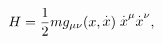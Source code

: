 \begin{equation}
H=\frac{1}{2}mg_{\mu \nu }(x,\stackrel{.}{x})\stackrel{.}{x}^{\mu }\stackrel{%
.}{x}^{\nu },
\end{equation}

